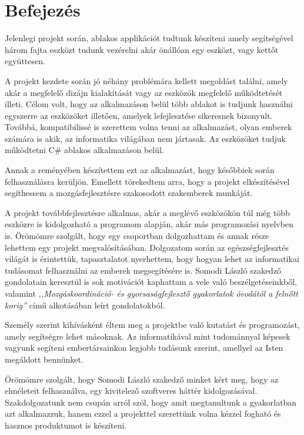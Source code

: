 \documentclass[tocnopagenum]{thesis-ekf}
\theoremstyle{definition}
\theoremstyle{remark}
\begin{document}
	\chapter*{Befejezés}
	Jelenlegi projekt során, ablakos applikációt tudtunk készíteni amely segítségével három fajta eszközt tudunk vezérelni akár önállóan egy eszközt, vagy kettőt együttesen.  
	\par
	A projekt kezdete során jó néhány problémára kellett megoldást találni, amely akár a megfelelő dizájn kialakítását vagy az eszközök megfelelő működtetését illeti. Célom volt, hogy az alkalmazáson belül több ablakot is tudjunk használni egyszerre az eszközöket illetően, amelyek lefejlesztése sikeresnek bizonyult. Továbbá, kompatibilissé is szerettem volna tenni az alkalmazást, olyan emberek számára is akik, az informatika világában nem jártasak. Az eszközöket tudjuk működtetni C\# ablakos alkalmazáson belül.
	\par
	Annak a reményében készítettem ezt az alkalmazást, hogy későbbiek során felhasználásra kerüljön. Emellett törekedtem arra, hogy a projekt elkészítésével segíthessem a mozgásfejlesztésre szakosodott szakemberek munkáját.
	\par
	A projekt továbbfejlesztésre alkalmas, akár a meglévő eszközökön túl még több eszközre is kidolgozható a programom alapján, akár más programozási nyelvben is.
	Örömömre szolgált, hogy egy csoportban dolgozhattam és annak része lehettem egy projekt megvalósításában. Dolgozatom során az egészségfejlesztés világát is érintettük, tapasztalatot nyerhettem, hogy hogyan lehet az informatikai tudásomat felhasználni az emberek megsegítésére is. Somodi László szakedző gondolatain keresztül is sok motivációt kaphattam a vele való beszélgetéseinkből, valamint \textit{,,Mozgáskoordináció- és gyorsaságfejlesztő gyakorlatok óvodától a felnőtt korig''} című alkotásában leírt gondolatokból.
	
	Személy szerint kihívásként éltem meg a projektbe való kutatást és programozást, amely segítségre lehet másoknak. Az informatikával mint tudománnyal képesek vagyunk segíteni embertársainkon legjobb tudásunk szerint, amellyel az Isten megáldott bennünket.
	
	Örömömre szolgált, hogy Somodi László szakedző minket kért meg, hogy az elméleteit felhasználva, egy kivitelező szoftveres háttér kidolgozásával. Szakdolgozatunk nem csupán arról szól, hogy amit megtanultunk a gyakorlatban azt alkalmazzuk, hanem ezzel a projekttel szerettünk volna kézzel fogható és hasznos produktumot is készíteni.
	
\end{document}
